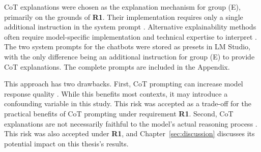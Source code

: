 \ac{CoT} explanations were chosen as the explanation mechanism for group (E), primarily on the grounds of \textbf{R1}. Their implementation requires only a single additional instruction in the system prompt \parencite{Wei2022, Kojima2022}. Alternative explainability methods often require model-specific implementation and technical expertise to interpret \parencite{Kumarage2026}. The two system prompts for the chatbots were stored as presets in LM Studio, with the only difference being an additional instruction for group (E) to provide \ac{CoT} explanations. The complete prompts are included in the Appendix.

This approach has two drawbacks. First, \ac{CoT} prompting can increase model response quality \parencite{Wei2022}. While this benefits most contexts, it may introduce a confounding variable in this study. This risk was accepted as a trade-off for the practical benefits of \ac{CoT} prompting under requirement \textbf{R1}. Second, \ac{CoT} explanations are not necessarily faithful to the model's actual reasoning process \parencite{Lyu2023}. This risk was also accepted under \textbf{R1}, and Chapter~\ref{sec:discussion} discusses its potential impact on this thesis's results.
